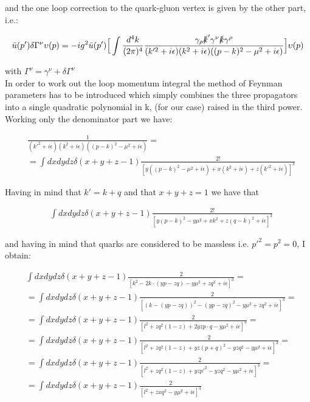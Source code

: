 \documentclass[a4paper,10pt]{article}
\begin{document}
and the one loop correction to the quark-gluon vertex is given by the other part, i.e.:
 
 \begin{align*}
  \bar{u}(p')\delta\Gamma^{\nu}\upsilon(p)=-ig^{2}\bar{u}(p')\Big[\int\frac{d^{4}k}{(2\pi)^{4}} \frac{\gamma_{\rho}\slashed{k}'\gamma^{\nu}\slashed{k}\gamma^{\rho}}{(k'^{2}+i\epsilon)(k^{2}+i\epsilon)((p-k)^{2}-\mu^{2}+i\epsilon)}\Big]\upsilon(p)
 \end{align*}

 with $\Gamma^{\nu}=\gamma^{\nu}+\delta\Gamma^{\nu}$\\
 
 In order to work out the loop momentum integral the method of Feynman parameters has to be introduced which simply 
 combines the three propagators into a single quadratic polynomial in k, (for our case) raised in the third power.\\
Working only the denominator part we have:

\begin{align*}
&\frac{1}{(k'^{2}+i\epsilon)(k^{2}+i\epsilon)((p-k)^{2}-\mu^{2}+i\epsilon)}=\\
& =\int dx dy dz \delta(x+y+z-1)\frac{2!}{[y((p-k)^{2}-\mu^{2}+i\epsilon)+x(k^{2}+i\epsilon)+z(k'^{2}+i\epsilon)]^{3}}
\end{align*}

Having in mind that $k'=k+q$ and that $x+y+z=1$ we have that 

\begin{align*}
 &\int dx dy dz \delta(x+y+z-1)\frac{2!}{[y(p-k)^{2}-y\mu^{2}+xk^{2}+z(q-k)^{2}+i\epsilon]^{3}}
\end{align*}
 
 and having in mind that quarks are considered to be massless i.e. $p'^{2}=p^{2}=0$, I obtain:
 
\begin{align*}
 &\int dxdydz\delta(x+y+z-1)\frac{2}{[k^{2}-2k\cdot(yp-zq)-y\mu^{2}+zq^{2}+i\epsilon]^{3}}=\\
 &=\int dxdydz\delta(x+y+z-1)\frac{2}{[(k-(yp-zq))^{2}-(yp-zq)^{2}-y\mu^{2}+zq^{2}+i\epsilon]^{3}}=\\
 &=\int dxdydz\delta(x+y+z-1)\frac{2}{[l^{2}+zq^{2}(1-z)+2yzp\cdot q-y\mu^{2}+i\epsilon]^{3}}=\\
 &=\int dxdydz\delta(x+y+z-1)\frac{2}{[l^{2}+zq^{2}(1-z)+yz(p+q)^{2}-yzq^{2}-y\mu^{2}+i\epsilon]^{3}}=\\
  &=\int dxdydz\delta(x+y+z-1)\frac{2}{[l^{2}+zq^{2}(1-z)+yzp'^{2}-yzq^{2}-y\mu^{2}+i\epsilon]^{3}}=\\
   &=\int dxdydz\delta(x+y+z-1)\frac{2}{[l^{2}+zxq^{2}-y\mu^{2}+i\epsilon]^{3}}
\end{align*}
\end{document}
